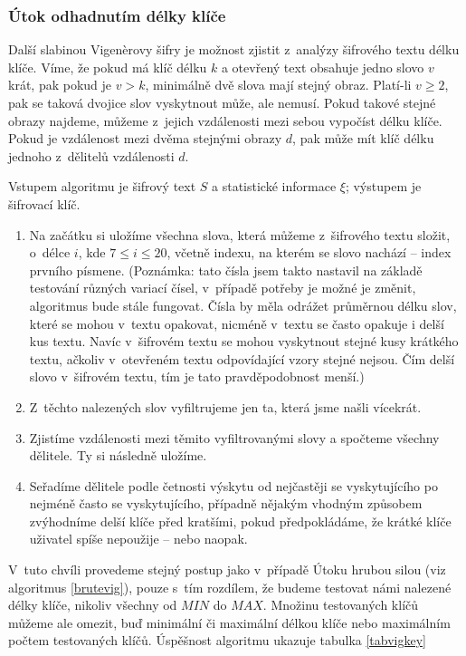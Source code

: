 \documentclass[12pt]{article}
\theoremstyle{definition}
\newcommand{\stats}{\xi}
\begin{document}
\subsubsection{Útok odhadnutím délky klíče}
\label{testkeylengthvig}
Další slabinou Vigenèrovy šifry je možnost zjistit z~analýzy šifrového textu délku klíče. Víme, že pokud má klíč délku $k$ a otevřený text obsahuje jedno slovo $v$ krát, pak pokud je $v>k$, minimálně dvě slova mají stejný obraz. Platí-li $v\ge2$, pak se taková dvojice slov vyskytnout může, ale nemusí. Pokud takové stejné obrazy najdeme, můžeme z~jejich vzdálenosti mezi sebou vypočíst délku klíče. Pokud je vzdálenost mezi dvěma stejnými obrazy $d$, pak může mít klíč délku jednoho z~dělitelů vzdálenosti $d$. 

Vstupem algoritmu je šifrový text $S$ a statistické informace $\stats$; výstupem je šifrovací klíč. 

\begin{enumerate}
\item Na začátku si uložíme všechna slova, která můžeme z~šifrového textu složit, o~délce $i$, kde $7\le i \le 20$, včetně indexu, na kterém se slovo nachází -- index prvního písmene. (Poznámka: tato čísla jsem takto nastavil na základě testování různých variací čísel, v~případě potřeby je možné je změnit, algoritmus bude stále fungovat. Čísla by měla odrážet průměrnou délku slov, které se mohou v~textu opakovat, nicméně v~textu se často opakuje i delší kus textu. Navíc v~šifrovém textu se mohou vyskytnout stejné kusy krátkého textu, ačkoliv v~otevřeném textu odpovídající vzory stejné nejsou. Čím delší slovo v~šifrovém textu, tím je tato pravděpodobnost menší.)
\item Z~těchto nalezených slov vyfiltrujeme jen ta, která jsme našli vícekrát. 
\item Zjistíme vzdálenosti mezi těmito vyfiltrovanými slovy a spočteme všechny dělitele. Ty si následně uložíme.
\item Seřadíme dělitele podle četnosti výskytu od nejčastěji se vyskytujícího po nejméně často se vyskytujícího, případně nějakým vhodným způsobem zvýhodníme delší klíče před kratšími, pokud předpokládáme, že krátké klíče uživatel spíše nepoužije -- nebo naopak.
\end{enumerate}

V~tuto chvíli provedeme stejný postup jako v~případě Útoku hrubou silou (viz algoritmus \ref{brutevig}), pouze s~tím rozdílem, že budeme testovat námi nalezené délky klíče, nikoliv všechny od $MIN$ do $MAX$. Množinu testovaných klíčů můžeme ale omezit, buď minimální či maximální délkou klíče nebo maximálním počtem testovaných klíčů. Úspěšnost algoritmu ukazuje tabulka \ref{tabvigkey}
\end{document}
